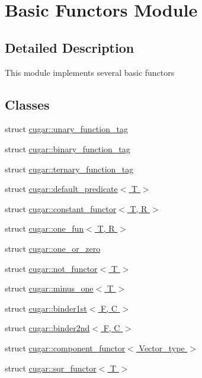 \hypertarget{group___basic_functors}{}\section{Basic Functors Module}
\label{group___basic_functors}


\subsection{Detailed Description}
This module implements several basic functors \subsection*{Classes}
\begin{DoxyCompactItemize}
\item 
struct \hyperlink{structcugar_1_1unary__function__tag}{cugar\+::unary\+\_\+function\+\_\+tag}
\item 
struct \hyperlink{structcugar_1_1binary__function__tag}{cugar\+::binary\+\_\+function\+\_\+tag}
\item 
struct \hyperlink{structcugar_1_1ternary__function__tag}{cugar\+::ternary\+\_\+function\+\_\+tag}
\item 
struct \hyperlink{structcugar_1_1default__predicate}{cugar\+::default\+\_\+predicate$<$ T $>$}
\item 
struct \hyperlink{structcugar_1_1constant__functor}{cugar\+::constant\+\_\+functor$<$ T, R $>$}
\item 
struct \hyperlink{structcugar_1_1one__fun}{cugar\+::one\+\_\+fun$<$ T, R $>$}
\item 
struct \hyperlink{structcugar_1_1one__or__zero}{cugar\+::one\+\_\+or\+\_\+zero}
\item 
struct \hyperlink{structcugar_1_1not__functor}{cugar\+::not\+\_\+functor$<$ T $>$}
\item 
struct \hyperlink{structcugar_1_1minus__one}{cugar\+::minus\+\_\+one$<$ T $>$}
\item 
struct \hyperlink{structcugar_1_1binder1st}{cugar\+::binder1st$<$ F, C $>$}
\item 
struct \hyperlink{structcugar_1_1binder2nd}{cugar\+::binder2nd$<$ F, C $>$}
\item 
struct \hyperlink{structcugar_1_1component__functor}{cugar\+::component\+\_\+functor$<$ Vector\+\_\+type $>$}
\item 
struct \hyperlink{structcugar_1_1sqr__functor}{cugar\+::sqr\+\_\+functor$<$ T $>$}

\end{DoxyCompactItemize}
